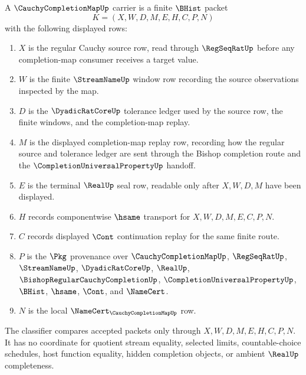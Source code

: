 \begin{definition}
\label{def:cauchy-completion-map-carrier}
A $\CauchyCompletionMapUp$ carrier is a finite $\BHist$ packet
$$
K=(X,W,D,M,E,H,C,P,N)
$$
with the following displayed rows:
\begin{enumerate}
\item $X$ is the regular Cauchy source row, read through $\RegSeqRatUp$ before any completion-map consumer receives a target value.
\item $W$ is the finite $\StreamNameUp$ window row recording the source observations inspected by the map.
\item $D$ is the $\DyadicRatCoreUp$ tolerance ledger used by the source row, the finite windows, and the completion-map replay.
\item $M$ is the displayed completion-map replay row, recording how the regular source and tolerance ledger are sent through the Bishop completion route and the $\CompletionUniversalPropertyUp$ handoff.
\item $E$ is the terminal $\RealUp$ seal row, readable only after $X,W,D,M$ have been displayed.
\item $H$ records componentwise $\hsame$ transport for $X,W,D,M,E,C,P,N$.
\item $C$ records displayed $\Cont$ continuation replay for the same finite route.
\item $P$ is the $\Pkg$ provenance over $\CauchyCompletionMapUp$, $\RegSeqRatUp$, $\StreamNameUp$, $\DyadicRatCoreUp$, $\RealUp$, $\BishopRegularCauchyCompletionUp$, $\CompletionUniversalPropertyUp$, $\BHist$, $\hsame$, $\Cont$, and $\NameCert$.
\item $N$ is the local $\NameCert_{\CauchyCompletionMapUp}$ row.
\end{enumerate}
The classifier compares accepted packets only through $X,W,D,M,E,H,C,P,N$. It has no coordinate for quotient stream equality, selected limits, countable-choice schedules, host function equality, hidden completion objects, or ambient $\RealUp$ completeness.
\end{definition}

